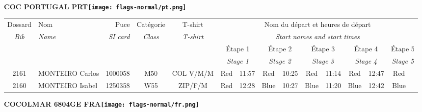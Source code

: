 \documentclass{report}
\begin{document}
  \Huge \centering \bfseries COC PORTUGAL  PRT\normalfont \footnotesize \sffamily \hfill \texttt{[image: flags-normal/pt.png]} \newline 
  \begin{longtable}{|c|l|r|c|c|*{5}{cc|}}
    Dossard & Nom  & Puce    & Catégorie & T-shirt & \multicolumn{10}{c|}{Nom du départ et heures de départ} \\
    \itshape Bib     & \itshape Name & \itshape SI card & \itshape Class  & \itshape  T-shirt  & \multicolumn{10}{c|}{\itshape Start names and start times} \\
    \hline
    & & & & & \multicolumn{2}{c|}{Étape 1} & \multicolumn{2}{c|}{Étape 2} & \multicolumn{2}{c|}{Étape 3} & \multicolumn{2}{c|}{Étape 4} & \multicolumn{2}{c|}{Étape 5} \\
    & & & & & \multicolumn{2}{c|}{\itshape Stage 1} & \multicolumn{2}{c|}{\itshape Stage 2} & \multicolumn{2}{c|}{\itshape Stage 3} & \multicolumn{2}{c|}{\itshape Stage 4} & \multicolumn{2}{c|}{\itshape Stage 5} \\
    \hline
    2161 & MONTEIRO Carlos & 1000058 & M50 & COL V/M/M & Red & 11:57 & Red & 10:25 & Red & 11:14 & Red & 12:47 & Red &  \\
    2160 & MONTEIRO Isabel & 1250358 & W55 & ZIP/F/M & Red & 12:28 & Blue & 10:27 & Blue & 11:20 & Blue & 12:42 & Blue &  \\
  \end{longtable}
\newpage
  \Huge \centering \bfseries COCOLMAR 6804GE FRA\normalfont \footnotesize \sffamily \hfill \texttt{[image: flags-normal/fr.png]} \newline 
\end{document}
